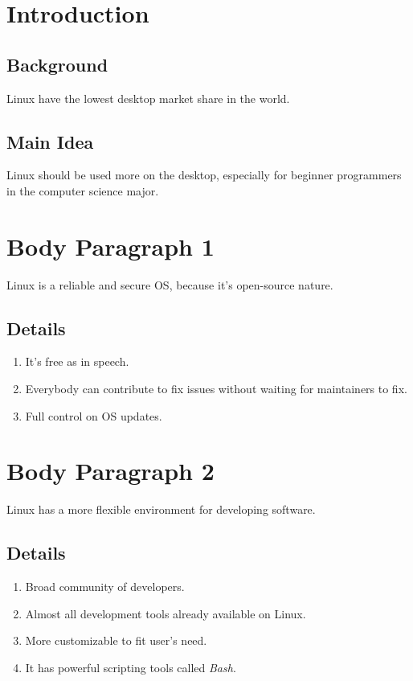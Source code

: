 \documentclass[a4paper, 10pt]{article}
\begin{document}
    \section*{Introduction}
    \subsection*{Background}
        Linux have the lowest desktop market share in the world.
    \subsection*{Main Idea}
        Linux should be used more on the desktop, especially for beginner programmers
        in the computer science major.  

    \section*{Body Paragraph 1}
        Linux is a reliable and secure OS, because it's open-source nature.
        \subsection*{Details}
        \begin{enumerate}
            \item It's free as in speech.
            \item Everybody can contribute to fix issues without waiting for maintainers to fix.
            \item Full control on OS updates.
        \end{enumerate}

    \section*{Body Paragraph 2}
        Linux has a more flexible environment for developing software.
        \subsection*{Details}
        \begin{enumerate}
            \item Broad community of developers.
            \item Almost all development tools already available on Linux.
            \item More customizable to fit user's need.
            \item It has powerful scripting tools called \emph{Bash}.
        \end{enumerate}
\end{document}
